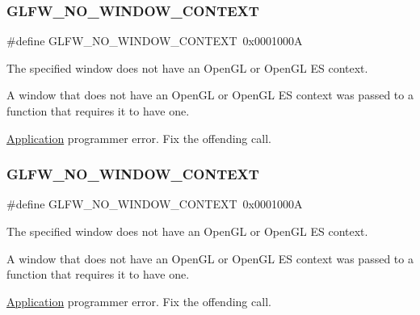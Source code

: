 \subsubsection{\texorpdfstring{G\+L\+F\+W\+\_\+\+N\+O\+\_\+\+W\+I\+N\+D\+O\+W\+\_\+\+C\+O\+N\+T\+E\+XT}{GLFW\_NO\_WINDOW\_CONTEXT}\hspace{0.1cm}{\footnotesize\ttfamily [1/5]}}
{\footnotesize\ttfamily \#define G\+L\+F\+W\+\_\+\+N\+O\+\_\+\+W\+I\+N\+D\+O\+W\+\_\+\+C\+O\+N\+T\+E\+XT~0x0001000A}



The specified window does not have an Open\+GL or Open\+GL ES context. 

A window that does not have an Open\+GL or Open\+GL ES context was passed to a function that requires it to have one.

\hyperlink{classApplication}{Application} programmer error. Fix the offending call. \mbox{\label{group__errors_gacff24d2757da752ae4c80bf452356487}} 
\subsubsection{\texorpdfstring{G\+L\+F\+W\+\_\+\+N\+O\+\_\+\+W\+I\+N\+D\+O\+W\+\_\+\+C\+O\+N\+T\+E\+XT}{GLFW\_NO\_WINDOW\_CONTEXT}\hspace{0.1cm}{\footnotesize\ttfamily [2/5]}}
{\footnotesize\ttfamily \#define G\+L\+F\+W\+\_\+\+N\+O\+\_\+\+W\+I\+N\+D\+O\+W\+\_\+\+C\+O\+N\+T\+E\+XT~0x0001000A}



The specified window does not have an Open\+GL or Open\+GL ES context. 

A window that does not have an Open\+GL or Open\+GL ES context was passed to a function that requires it to have one.

\hyperlink{classApplication}{Application} programmer error. Fix the offending call. \mbox{\label{group__errors_gacff24d2757da752ae4c80bf452356487}} 
